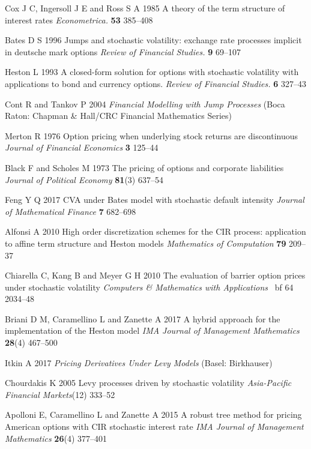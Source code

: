 \documentclass[a4paper]{jpconf}
\begin{document}
\begin{thebibliography}{18}

 Cox J C, Ingersoll J E and Ross S A 1985 A theory of the term structure of interest rates  {\it Econometrica.} {\bf 53} 385--408

 Bates D S 1996 Jumps and stochastic volatility: exchange rate processes implicit in deutsche mark options {\it Review of Financial Studies.}  {\bf 9} 69--107

 Heston L 1993 A closed-form solution for options with stochastic volatility with applications to bond and currency options. {\it Review of Financial Studies.} {\bf 6} 327--43

 Cont R and Tankov P 2004 {\it Financial Modelling with Jump Processes} (Boca Raton: Chapman \& Hall/CRC Financial Mathematics Series)

 Merton R 1976 Option pricing when underlying stock returns are discontinuous {\it Journal of Financial Economics} {\bf 3} 125--44

 Black F and Scholes M 1973 The pricing of options and corporate liabilities {\it Journal of Political Economy} {\bf 81}(3) 637--54

 Feng Y Q 2017 CVA under Bates model with stochastic default intensity {\it Journal of Mathematical Finance} {\bf 7} 682--698

 Alfonsi A 2010 High order discretization schemes for the CIR process: application to affine term structure and Heston models {\it Mathematics of Computation} {\bf 79} 209--37

 Chiarella C, Kang B and Meyer G H 2010 The evaluation of barrier option prices under stochastic volatility {\it Computers \& Mathematics with Applications} {\ bf 64} 2034--48

 Briani D M, Caramellino L and Zanette A 2017 A hybrid approach for the implementation of the Heston model {\it IMA Journal of Management Mathematics} {\bf 28}(4) 467--500

 Itkin A 2017 {\it Pricing Derivatives Under Levy Models} (Basel: Birkhauser) 

 Chourdakis K 2005 Levy processes driven by stochastic volatility {\it Asia-Pacific Financial Markets}(12) 333--52

 Apolloni E, Caramellino L and Zanette A 2015 A robust tree method for pricing American options with CIR stochastic interest rate {\it IMA Journal of Management Mathematics} {\bf 26}(4) 377--401


\end{thebibliography}
\end{document}
